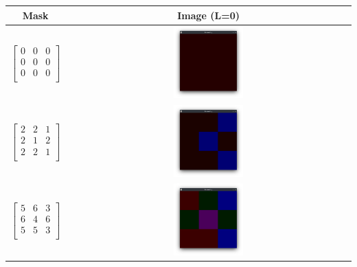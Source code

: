 \begin{tabular}{|c|c|}
    \hline
    Mask & Image (L=0) \\
    \hline
    \begin{equation*}
        \begin{bmatrix}
            0 & 0 & 0 \\
            0 & 0 & 0 \\
            0 & 0 & 0 \\
        \end{bmatrix}
    \end{equation*}
    &
    \includegraphics[width=0.25\textwidth]{./latex/img/m0}
    \\
    \hline
    \begin{equation*}
        \begin{bmatrix}
            2 & 2 & 1 \\
            2 & 1 & 2 \\
            2 & 2 & 1 \\
        \end{bmatrix}
    \end{equation*}
    &
    \includegraphics[width=0.25\textwidth]{./latex/img/m1}
    \\
    \hline
    \begin{equation*}
        \begin{bmatrix}
            5 & 6 & 3 \\
            6 & 4 & 6 \\
            5 & 5 & 3 \\
        \end{bmatrix}
    \end{equation*}
    &
    \includegraphics[width=0.25\textwidth]{./latex/img/m2}

\end{tabular}
